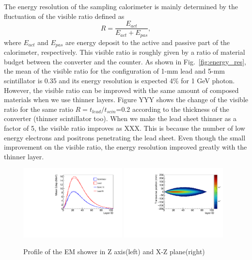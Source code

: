 \documentclass[jkps,preprint,fleqn,showpacs,showkeys]{revtex4}
\begin{document}
The energy resolution of the sampling calorimeter is mainly determined by the fluctuation of the visible ratio defined as 
\begin{equation}
R = { \frac{E_{act}} {E_{act}+E_{pas}}},
\end{equation}
where $E_{act}$ and $E_{pas}$ are energy deposit to the active and passive part of the calorimeter, respectively. This visible ratio is roughly given by a ratio of material budget between the converter and the counter. 
As shown in Fig.~\ref{fig:energy_res}, the mean of the visible ratio for the configuration of 1-mm lead and 5-mm scintillator is  0.35 and its energy resolution is expected 4\% for 1 GeV photon. However, the visible ratio can be improved with the same amount of composed materials when we use thinner layers. Figure YYY shows the change of the visible ratio for the same ratio $R=t_{lead}/t_{scin}$=0.2 according to the thickness of the converter (thinner scintillator too). When we make the lead sheet thinner as a factor of 5, the visible ratio improves as XXX. This is because the number of low energy electrons and positrons penetrating the lead sheet. Even though the small improvement on the visible ratio, the energy resolution improved greatly with the thinner layer.


\begin{figure}[!hbt]
\includegraphics[width=0.48\textwidth]{figures/Sec2/ShowerProfileZ.pdf}
\includegraphics[width=0.48\textwidth]{figures/Sec2/ShowerProfileXZ.pdf}
\caption{Profile of the EM shower in Z axis(left) and X-Z plane(right)  }
\label{fig:EMshower}
\end{figure}
\end{document}
